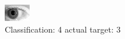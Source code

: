 \begin{figure}[h!]
\begin{center}
\includegraphics[width=0.60\columnwidth]{figures/ID316_class_4_target_3.png}
\end{center}
\caption{ Classification: 4 actual target: 3}
\label{fig:ID316_class_4_target_3}
\end{figure}
